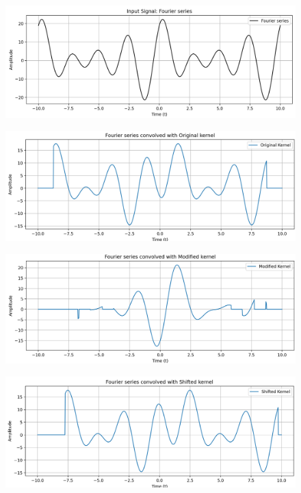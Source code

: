 \begin{figure}[H]
    \centering
    \includegraphics[width=\linewidth]{figs/fourierbreak.png}
\end{figure}
\begin{figure}[H]
    \centering
    \includegraphics[width=\linewidth]{figs/fourierconv.png}
\end{figure}
\begin{figure}[H]
    \centering
    \includegraphics[width=\linewidth]{figs/modifiedfourier.png}
\end{figure}
\begin{figure}[H]
    \centering
    \includegraphics[width=\linewidth]{figs/shiftedfourier.png}
\end{figure}

